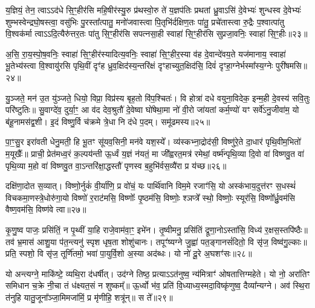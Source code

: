 य॒ज्ञियं॒ तेन॒ त्वा\-ऽ\-ऽद॑धे सि॒ꣳ॒हीर॑सि महि॒षीर॑स्यु॒रु प्र॑थस्वो॒रु ते॑ य॒ज्ञप॑तिः प्रथतां ध्रु॒वा\-ऽसि॑ दे॒वेभ्यः॑ शुन्धस्व दे॒वेभ्यः॑ शुम्भस्वेन्द्रघो॒षस्त्वा॒ वसु॑भिः पु॒रस्ता᳚त्पातु॒ मनो॑जवास्त्वा पि॒तृभि॑र्दक्षिण॒तः पा॑तु॒ प्रचे॑तास्त्वा रु॒द्रैः प॒श्वात्पा॑तु वि॒श्वक॑र्मा त्वा\-ऽ\-ऽदि॒त्यैरु॑त्तर॒तः पा॑तु सि॒ꣳ॒हीर॑सि सपत्नसा॒ही स्वाहा॑ सि॒ꣳ॒हीर॑सि सुप्रजा॒वनिः॒ स्वाहा॑ सि॒ꣳ॒हीः॥२३॥

अ॒सि॒ रा॒य॒स्पो॒ष॒वनिः॒ स्वाहा॑ सि॒ꣳ॒हीर॑स्यादित्य॒वनिः॒ स्वाहा॑ सि॒ꣳ॒हीर॒स्या व॑ह दे॒वान्दे॑वय॒ते यज॑मानाय॒ स्वाहा॑ भू॒तेभ्य॑स्त्वा वि॒श्वायु॑रसि पृथि॒वीं दृꣳ॑ह ध्रुव॒क्षिद॑स्य॒न्तरि॑क्षं दृꣳहाच्युत॒क्षिद॑सि॒ दिवं॑ दृꣳहा॒ग्नेर्भस्मा᳚स्य॒ग्नेः पुरी॑षमसि॥२४॥

{\anuvakamend[{नाम॑ सुप्रजा॒वनिः॒ स्वाहा॑ सि॒ꣳ॒हीः पञ्च॑त्रिꣳशच्च॥12॥}]}

यु॒ञ्जते॒ मन॑ उ॒त यु॑ञ्जते॒ धियो॒ विप्रा॒ विप्र॑स्य बृह॒तो वि॑प॒श्चितः॑। वि होत्रा॑ दधे वयुना॒विदेक॒ इन्म॒ही दे॒वस्य॑ सवि॒तुः परि॑ष्टुतिः॥ सु॒वाग्दे॑व॒ दुर्या॒ꣳ॒ आ व॑द देव॒श्रुतौ॑ दे॒वेष्वा घो॑षेथा॒मा नो॑ वी॒रो जा॑यतां कर्म॒ण्यो॑ यꣳ सर्वे॑\-ऽनु॒जीवा॑म॒ यो ब॑हू॒नामस॑द्व॒शी। इ॒दं विष्णु॒र्वि च॑क्रमे त्रे॒धा नि द॑धे प॒दम्। समू॑ढमस्य॥२५॥

पा॒ꣳ॒सु॒र इरा॑वती धेनु॒मती॒ हि भू॒तꣳ सू॑यव॒सिनी॒ मन॑वे यश॒स्ये᳚। व्य॑स्कभ्ना॒द्रोद॑सी॒ विष्णु॑रे॒ते दा॒धार॑ पृथि॒वीम॒भितो॑ म॒यूखैः᳚॥ प्राची॒ प्रेत॑मध्व॒रं क॒ल्पय॑न्ती ऊ॒र्ध्वं य॒ज्ञं न॑यतं॒ मा जी᳚ह्वरत॒मत्र॑ रमेथां॒ वर्ष्म॑न्पृथि॒व्या दि॒वो वा॑ विष्णवु॒त वा॑ पृथि॒व्या म॒हो वा॑ विष्णवु॒त वा॒\-ऽन्तरि॑क्षा॒द्धस्तौ॑ पृणस्व ब॒हुभि॑र्वस॒व्यै॑रा प्र य॑च्छ॥२६॥

दक्षि॑णा॒दोत स॒व्यात्। विष्णो॒र्नुकं॑ वी॒र्या॑णि॒ प्र वो॑चं॒ यः पार्थि॑वानि विम॒मे रजाꣳ॑सि॒ यो अस्क॑भाय॒दुत्त॑रꣳ स॒धस्थं॑ विचकमा॒णस्त्रे॒धोरु॑गा॒यो विष्णो॑ र॒राट॑मसि॒ विष्णोः᳚ पृ॒ष्ठम॑सि॒ विष्णोः॒ श्ञप्त्रे᳚ स्थो॒ विष्णोः॒ स्यूर॑सि॒ विष्णो᳚र्ध्रु॒वम॑सि वैष्ण॒वम॑सि॒ विष्ण॑वे त्वा॥२७॥

{\anuvakamend[{अ॒स्य॒ य॒च्छैका॒न्नच॑त्वारि॒ꣳ॒शच्च॑॥13॥}]}

कृ॒णु॒ष्व पाजः॒ प्रसि॑तिं॒ न पृ॒थ्वीं या॒हि राजे॒वाम॑वा॒ꣳ॒ इभे॑न। तृ॒ष्वीमनु॒ प्रसि॑तिं द्रूणा॒नो\-ऽस्ता॑सि॒ विध्य॑ र॒क्षस॒स्तपि॑ष्ठैः॥ तव॑ भ्र॒मास॑ आशु॒या प॑त॒न्त्यनु॑ स्पृश धृष॒ता शोशु॑चानः। तपूꣳ॑ष्यग्ने जु॒ह्वा॑ पत॒ङ्गानसं॑दितो॒ वि सृ॑ज॒ विष्व॑गु॒ल्काः॥ प्रति॒ स्पशो॒ वि सृ॑ज॒ तूर्णि॑तमो॒ भवा॑ पा॒युर्वि॒शो अ॒स्या अद॑ब्धः। यो नो॑ दू॒रे अ॒घशꣳ॑सः॥२८॥

यो अन्त्यग्ने॒ माकि॑ष्टे॒ व्यथि॒रा द॑धर्षीत्। उद॑ग्ने तिष्ठ॒ प्रत्या\-ऽ\-ऽत॑नुष्व॒ न्य॑मित्राꣳ॑ ओषतात्तिग्महेते। यो नो॒ अरा॑तिꣳ समिधान च॒क्रे नी॒चा तं ध॑क्ष्यत॒सं न शुष्कम्᳚॥ ऊ॒र्ध्वो भ॑व॒ प्रति॑ वि॒ध्याध्य॒स्मदा॒विष्कृ॑णुष्व॒ दैव्या᳚न्यग्ने। अव॑ स्थि॒रा त॑नुहि यातु॒जूना᳚ञ्जा॒मिमजा॑मिं॒ प्र मृ॑णीहि॒ शत्रू॑न्॥ स ते᳚॥२९॥

